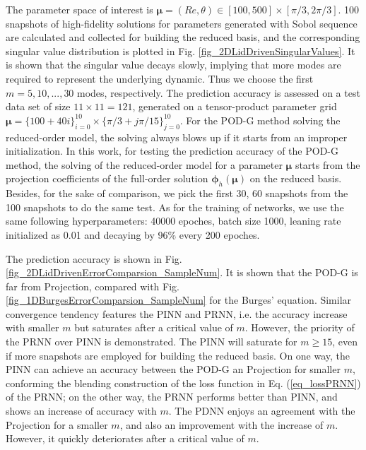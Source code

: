 \documentclass[preprint, 10pt]{elsarticle}
\begin{document}
The parameter space of interest is $\pmb{\mu}=(Re, \theta) \in [100,500] \times [\pi/3, 2\pi/3]$. 100 snapshots of high-fidelity solutions for parameters generated with Sobol sequence are calculated and collected for building the reduced basis, and the corresponding singular value distribution is plotted in Fig. \ref{fig_2DLidDrivenSingularValues}. It is shown that the singular value decays slowly, implying that more modes are required to represent the underlying dynamic. Thus we choose the first $m=5, 10,...,30$ modes, respectively.
The prediction accuracy is assessed on a test data set of size $11 \times 11=121$, generated on a tensor-product parameter grid $\pmb{\mu}=\{100+ 40i\}_{i=0}^{10} \times \{\pi/3+ j\pi/15\}_{j=0}^{10}$.
For the POD-G method solving the reduced-order model, the solving always blows up if it starts from an improper initialization. In this work, for testing the prediction accuracy of the POD-G method, the solving of the reduced-order model for a parameter $\pmb{\mu}$ starts from the projection coefficients of the full-order solution $\pmb{\phi}_h \left( \pmb{\mu} \right)$ on the reduced basis.
Besides, for the sake of comparison, we pick the first 30, 60 snapshots from the 100 snapshots to do the same test. As for the training of networks, we use the same following hyperparameters: 40000 epoches, batch size 1000, leaning rate initialized as 0.01 and decaying by 96\% every 200 epoches.

The prediction accuracy is shown in Fig. \ref{fig_2DLidDrivenErrorComparsion_SampleNum}. It is shown that the POD-G is far from Projection, compared with Fig. \ref{fig_1DBurgesErrorComparsion_SampleNum} for the Burges' equation. Similar convergence tendency features the PINN and PRNN, i.e. the accuracy increase with  smaller $m$ but saturates after a critical value of $m$. However, the priority of the PRNN over PINN is demonstrated. The PINN will saturate for $m \ge 15$, even if more snapshots are employed for building the reduced basis.
On one way, the PINN can achieve an accuracy between the POD-G an Projection for smaller $m$, conforming the blending construction of the loss function in Eq. (\ref{eq_lossPRNN}) of the PRNN; on the other way, the PRNN performs better than PINN, and shows an increase of accuracy with $m$. The PDNN enjoys an agreement with the Projection for a smaller $m$, and also an improvement with the increase of $m$. However, it quickly deteriorates after a critical value of $m$.
\end{document}
